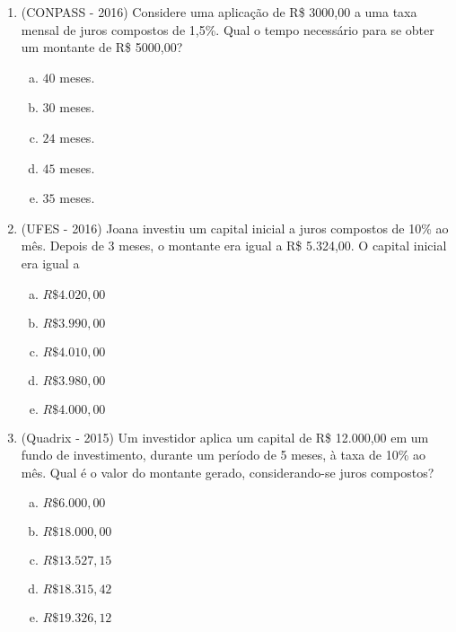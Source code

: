 \begin{enumerate}
  \item (CONPASS - 2016) Considere uma aplicação de R\$ 3000,00 a uma taxa mensal de juros compostos de 1,5\%. Qual o tempo necessário para se obter um montante de R\$ 5000,00?
  \begin{enumerate}[a)]
  \item $40$ meses.
  \item $30$ meses.
  \item $24$ meses.
  \item $45$ meses.
  \item $35$ meses.
  \end{enumerate}

  \item (UFES - 2016) Joana investiu um capital inicial a juros compostos de 10\% ao mês. Depois de 3 meses, o montante era igual a R\$ 5.324,00. O capital inicial era igual a
  \begin{enumerate}[a)]
  \item $R\$ 4.020,00$
  \item $R\$ 3.990,00$
  \item $R\$ 4.010,00$
  \item $R\$ 3.980,00$
  \item $R\$ 4.000,00$
  \end{enumerate}

  \item (Quadrix - 2015) Um investidor aplica um capital de R\$ 12.000,00 em um fundo de investimento, durante um período de 5 meses, à taxa de 10\% ao mês. Qual é o valor do montante gerado, considerando-se juros compostos?
  \begin{enumerate}[a)]
  \item $R\$ 6.000,00$
  \item $R\$ 18.000,00$
  \item $R\$ 13.527,15$
  \item $R\$ 18.315,42$
  \item $R\$ 19.326,12$
  \end{enumerate}

 \end{enumerate}







